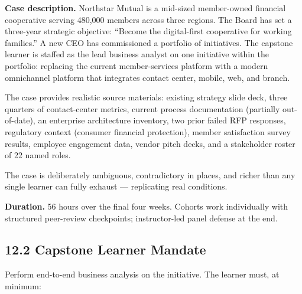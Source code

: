 \documentclass[11pt,letterpaper,oneside]{report}
\begin{document}
\textbf{Case description.} Northstar Mutual is a mid-sized member-owned financial cooperative serving 480{,}000 members across three regions. The Board has set a three-year strategic objective: ``Become the digital-first cooperative for working families.'' A new CEO has commissioned a portfolio of initiatives. The capstone learner is staffed as the lead business analyst on one initiative within the portfolio: replacing the current member-services platform with a modern omnichannel platform that integrates contact center, mobile, web, and branch.

The case provides realistic source materials: existing strategy slide deck, three quarters of contact-center metrics, current process documentation (partially out-of-date), an enterprise architecture inventory, two prior failed RFP responses, regulatory context (consumer financial protection), member satisfaction survey results, employee engagement data, vendor pitch decks, and a stakeholder roster of 22 named roles.

The case is deliberately ambiguous, contradictory in places, and richer than any single learner can fully exhaust --- replicating real conditions.

\textbf{Duration.} 56 hours over the final four weeks. Cohorts work individually with structured peer-review checkpoints; instructor-led panel defense at the end.

\subsection*{12.2 Capstone Learner Mandate}
Perform end-to-end business analysis on the initiative. The learner must, at minimum:
\end{document}
